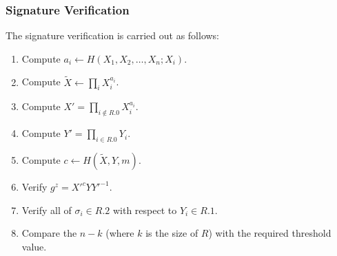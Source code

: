 \subsubsection{Signature Verification}
The signature verification is carried out as follows:
\begin{enumerate}
    \item Compute $a_i\leftarrow H(X_1,X_2,\dots,X_n;X_i)$.
    \item Compute $\tilde{X}\leftarrow\prod_i X_i^{a_i}$.
    \item Compute $X' = \prod_{i\notin R.0}X_i^{a_i}$.
    \item Compute $Y' = \prod_{i\in R.0} Y_i$.
    \item Compute $c\leftarrow H(\tilde{X}, Y, m)$.
    \item Verify $g^z=X'^cYY'^{-1}$.
    \item Verify all of $\sigma_i\in R.2$ with respect to $Y_i\in R.1$.
    \item Compare the $n-k$ (where $k$ is the size of $R$) with the required threshold value.
\end{enumerate}